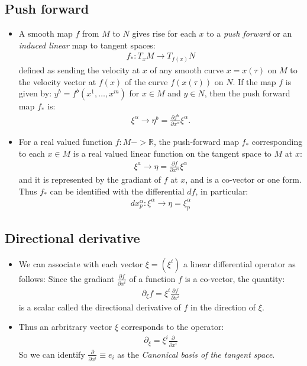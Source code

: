 \documentclass[11pt]{article}
\numberwithin{equation}{section}
\DeclareRobustCommand{\RR}{\mathbb{R}}
\begin{document}
\subsection{Push forward}
\begin{itemize}
  \item A smooth map $f$ from $M$ to $N$ gives rise for each $x$ to a \emph{push forward} or an \emph{induced linear} map to tangent spaces:
  \begin{align*}
      f_{\ast}: T_{x}M \rightarrow T_{f(x)}N
    \end{align*}  
    defined as sending the velocity at $x$ of any smooth curve $x =x(\tau)$ on $M$ to the velocity vector at $f(x)$ of the curve $f(x(\tau))$ on $N$. If the map $f$ is given by: $y^b = f^b(x^{1},\ldots,x^m)$ for $x \in M$ and $y \in N$, then the push forward map $f_{\ast}$ is:
    \begin{align*}
      \xi^{\alpha} \rightarrow \eta^{b} = \frac{\partial f^{b}}{\partial x^{\alpha}}\xi^{\alpha}. 
    \end{align*}

    \item For a real valued function $f: M -> \RR$, the push-forward map $f_{\ast}$ corresponding to each $x\in M$ is a real valued linear function on the tangent space to $M$ at $x$: 
    \begin{align*}
      \xi^{a} \rightarrow \eta = \frac{\partial f}{\partial x^{\alpha}}\xi^{\alpha}
    \end{align*}
    and it is represented by the gradiant of $f$ at $x$, and is a co-vector or one form. Thus $f_{\ast}$ can be identified with the differential $df$, in particular:
    \begin{align*}
      dx^{\alpha}_{p}: \xi^{\alpha}\rightarrow\eta =\xi^{\alpha}_{p}
    \end{align*}
\end{itemize}

\subsection{Directional derivative}
\begin{itemize}
  \item We can associate with each vector $\xi = (\xi^{i})$ a linear differential operator as follows: Since the gradiant $\frac{\partial f}{\partial x^i}$ of a function $f$ is a co-vector, the quantity:
  \begin{align*}
    \partial_{\xi}f = \xi^{i}\frac{\partial f}{\partial x^{i}}
  \end{align*}
  is a scalar called the directional derivative of $f$ in the direction of $\xi$. 

  \item Thus an arbritrary vector $\xi$ corresponds to the operator:
  \begin{align*}
    \partial_{\xi} = \xi^{i}\frac{\partial }{\partial x^i}
  \end{align*}
  So we can identify $\frac{\partial}{\partial x^i}\equiv e_{i}$ as the \emph{Canonical basis of the tangent space}. 
\end{itemize} 
\end{document}
